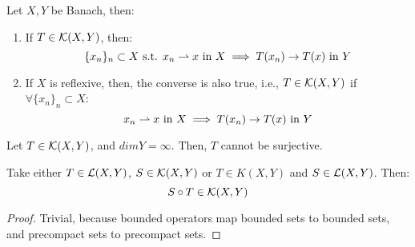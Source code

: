 \vspace{1em}

\begin{ftheorem}
    Let $X, Y$ be Banach, then:
    \vspace{1em}
    \begin{enumerate}[label=(\roman*)]
        \item If $T \in \mathcal{K}(X, Y)$, then:
        $$\{x_n\}_n \subset X \text{ s.t. } x_n \rightharpoonup x \text{ in } X \implies T(x_n) \to T(x) \text{ in } Y$$

        \vspace{1em}

        \item If $X$ is reflexive, then, the converse is also true, i.e., $T \in \mathcal{K}(X, Y)$ if\\
        $\forall \{x_n\}_n \subset X$:
        $$x_n \rightharpoonup x \text{ in } X \implies T(x_n) \to T(x) \text{ in } Y$$
    
    \end{enumerate}
    
\end{ftheorem}

\vspace{1em}

\begin{fproposition}
    Let $T \in \mathcal{K}(X, Y)$, and $dim Y = \infty$. Then, $T$ cannot be surjective.
\end{fproposition}

\begin{fproposition}
    Take either $T \in \mathcal{L}(X, Y)$, $S \in \mathcal{K}(X, Y)$ or $T \in K(X, Y)$ and $S \in \mathcal{L}(X, Y)$. Then:
    $$ S \circ T \in \mathcal{K}(X, Y)$$
\end{fproposition}

\begin{proof}
    Trivial, because bounded operators map bounded sets to bounded sets, and precompact sets to precompact sets.

\end{proof}

